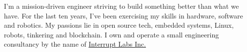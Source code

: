 \documentclass[10pt]{developercv} %
\begin{document}
\begin{minipage}[t]{0.4\textwidth} %
	\vspace{-\baselineskip} %

I'm a mission-driven engineer striving to build something better than what we have. For the last ten years, I've been exercising my skills in hardware, software and robotics. My passions lie in open source tech, embedded systems, Linux, robots, tinkering and blockchain. I own and operate a small engineering consultancy by the name of \href{interruptlabs.ca/}{Interrupt Labs Inc.}

\end{minipage}
\hfill %
\begin{minipage}[t]{0.5\textwidth} %
	\vspace{-\baselineskip} %
	\begin{barchart}{5.5}
	\end{barchart}
\end{minipage}

\end{document}
